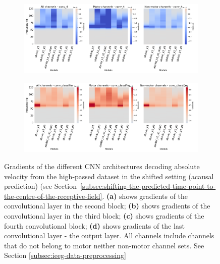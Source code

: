 \begin{figure}[!htbp]\ContinuedFloat
\begin{subfigure}[b]{\textwidth}
   \includegraphics[width=1\linewidth]{img/appendix/A/conv-4/hp-sm/absVel-model_gradients_all_kinds}
   \caption{}
   \label{fig:absVel-hp-shifted-grads-conv-4}
\end{subfigure}

\begin{subfigure}[b]{\textwidth}
   \includegraphics[width=1\linewidth]{img/appendix/A/conv-classifier/hp-sm/absVel-model_gradients_all_kinds}
   \caption{}
   \label{fig:absVel-hp-shifted-grads-conv-classifier}
\end{subfigure}

\caption[]{Gradients of the different CNN architectures decoding absolute velocity from the high-passed dataset in the shifted setting (acausal prediction) (see Section~\ref{subsec:shifting-the-predicted-time-point-to-the-centre-of-the-receptive-field}. \textbf{(a)} shows gradients of the convolutional layer in the second block; \textbf{(b)} shows gradients of the convolutional layer in the third block; \textbf{(c)} shows gradients of the fourth convolutional block; \textbf{(d)} shows gradients of the last convolutional layer - the output layer. All channels include channels that do not belong to motor neither non-motor channel sets. See Section \ref{subsec:ieeg-data-preprocessing}}
\label{fig:absVel-hp-shifted-grads}
\end{figure}